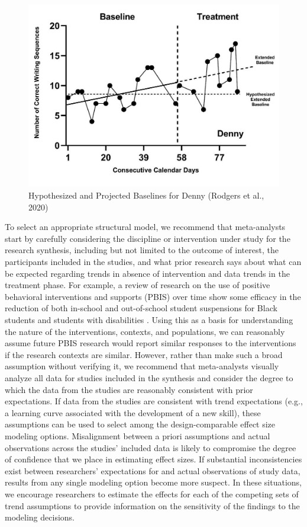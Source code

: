 \documentclass[
]{book}
\begin{document}
\begin{figure}
\includegraphics[width=0.75\linewidth]{images/Rodgers-2020-Denny} \caption{Hypothesized and Projected Baselines for Denny (Rodgers et al., 2020)}\label{fig:Rodgers-2020-Denny}
\end{figure}

To select an appropriate structural model, we recommend that meta-analysts start by carefully considering the discipline or intervention under study for the research synthesis, including but not limited to the outcome of interest, the participants included in the studies, and what prior research says about what can be expected regarding trends in absence of intervention and data trends in the treatment phase. For example, a review of research on the use of positive behavioral interventions and supports (PBIS) over time show some efficacy in the reduction of both in-school and out-of-school student suspensions for Black students and students with disabilities \citep[see][ for a review]{Gage2020}. Using this as a basis for understanding the nature of the interventions, contexts, and populations, we can reasonably assume future PBIS research would report similar responses to the interventions if the research contexts are similar. However, rather than make such a broad assumption without verifying it, we recommend that meta-analysts visually analyze all data for studies included in the synthesis and consider the degree to which the data from the studies are reasonably consistent with prior expectations. If data from the studies are consistent with trend expectations (e.g., a learning curve associated with the development of a new skill), these assumptions can be used to select among the design-comparable effect size modeling options. Misalignment between a priori assumptions and actual observations across the studies' included data is likely to compromise the degree of confidence that we place in estimating effect sizes. If substantial inconsistencies exist between researchers' expectations for and actual observations of study data, results from any single modeling option become more suspect. In these situations, we encourage researchers to estimate the effects for each of the competing sets of trend assumptions to provide information on the sensitivity of the findings to the modeling decisions.
\end{document}
